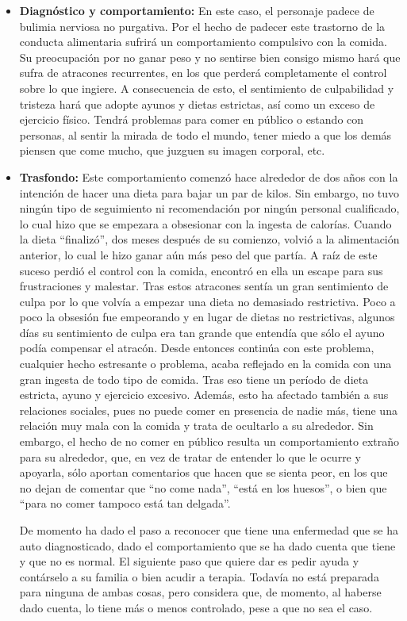 \documentclass[12pt, a4paper,twoside,titlepage]{book}
\begin{document}
\begin{itemize}
{    }
    \item {\textbf{Diagnóstico y comportamiento:}
     En este caso, el personaje padece de bulimia nerviosa no purgativa. Por el hecho de padecer este trastorno de la conducta alimentaria sufrirá un comportamiento compulsivo con la comida. Su preocupación por no ganar peso y no sentirse bien consigo mismo hará que sufra de atracones recurrentes, en los que perderá completamente el control sobre lo que ingiere. A consecuencia de esto, el sentimiento de culpabilidad y tristeza hará que adopte ayunos y dietas estrictas, así como un exceso de ejercicio físico. Tendrá problemas para comer en público o estando con personas, al sentir la mirada de todo el mundo, tener miedo a que los demás piensen que come mucho, que juzguen su imagen corporal, etc.  
     }
    \item {\textbf{Trasfondo:}
    Este comportamiento comenzó hace alrededor de dos años con la intención de hacer una dieta para bajar un par de kilos. Sin embargo, no tuvo ningún tipo de seguimiento ni recomendación por ningún personal cualificado, lo cual hizo que se empezara a obsesionar con la ingesta de calorías. Cuando la dieta “finalizó”, dos meses después de su comienzo, volvió a la alimentación anterior, lo cual le hizo ganar aún más peso del que partía. A raíz de este suceso perdió el control con la comida, encontró en ella un escape para sus frustraciones y malestar. Tras estos atracones sentía un gran sentimiento de culpa por lo que volvía a empezar una dieta no demasiado restrictiva. Poco a poco la obsesión fue empeorando y en lugar de dietas no restrictivas, algunos días su sentimiento de culpa era tan grande que entendía que sólo el ayuno podía compensar el atracón. Desde entonces continúa con este problema, cualquier hecho estresante o problema, acaba reflejado en la comida con una gran ingesta de todo tipo de comida. Tras eso tiene un período de dieta estricta, ayuno y ejercicio excesivo. Además, esto ha afectado también a sus relaciones sociales, pues no puede comer en presencia de nadie más, tiene una relación muy mala con la comida y trata de ocultarlo a su alrededor. Sin embargo, el hecho de no comer en público resulta un comportamiento extraño para su alrededor, que, en vez de tratar de entender lo que le ocurre y apoyarla, sólo aportan comentarios que hacen que se sienta peor, en los que no dejan de comentar que ``no come nada'', ``está en los huesos'', o bien que ``para no comer tampoco está tan delgada''. 
    
    De momento ha dado el paso a reconocer que tiene una enfermedad que se ha auto diagnosticado, dado el comportamiento que se ha dado cuenta que tiene y que no es normal. El siguiente paso que quiere dar es pedir ayuda y contárselo a su familia o bien acudir a terapia. Todavía no está preparada para ninguna de ambas cosas, pero considera que, de momento, al haberse dado cuenta, lo tiene más o menos controlado, pese a que no sea el caso.
    }
    

\end{itemize}
\end{document}
